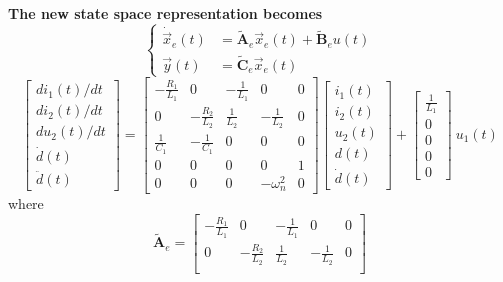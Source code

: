 \documentclass[12pt,a4paper,oneside]{book}
\begin{document}
\begin{onehalfspace}
\begin{mybox}
	\noindent\textbf{The new state space representation becomes}
	\begin{equation}
		\left\lbrace \begin{aligned}
			\dot{\vec{x}}_e(t) &= \tilde{\mathbf{A}}_e \vec{x}_e(t) + 
			\tilde{\mathbf{B}}_e u(t) \\[6pt]
			{\vec{y}}(t) &= \tilde{\mathbf{C}}_e \vec{x}_e(t)
		\end{aligned}\right. 
	\end{equation}
	\begin{equation}
		\begin{bmatrix}
			di_1(t)/dt \\[6pt]
			di_2(t)/dt \\[6pt]
			du_2(t)/dt \\[6pt]
			\dot{d}(t) \\[6pt]
			\ddot{d}(t)
		\end{bmatrix} =
		\begin{bmatrix}
			-\frac{R_1}{L_1} & 0 & -\frac{1}{L_1} & 0 & 0\\[6pt]
			0 & -\frac{R_2}{L_2} & \frac{1}{L_2} & -\frac{1}{L_2} & 0\\[6pt]
			\frac{1}{C_1} & -\frac{1}{C_1} & 0 & 0 & 0 \\[6pt]
			0 & 0 & 0 & 0 & 1 \\[6pt]
			0 & 0 & 0 & -\omega_n^2 & 0
		\end{bmatrix} 
		\begin{bmatrix}
			i_1(t) \\[6pt]
			i_2(t)\\[6pt]
			u_2(t)\\[6pt]
			d(t) \\[6pt]
			\dot{d}(t)
		\end{bmatrix} + 
		\begin{bmatrix}
			\frac{1}{L_1} \\[6pt]
			0 \\[6pt]
			0 \\[6pt]
			0 \\[6pt]
			0
		\end{bmatrix} \ u_1(t)
	\end{equation}
	where
	\begin{equation*}
		\tilde{\mathbf{A}}_e = 
		\begin{bmatrix}
			-\frac{R_1}{L_1} & 0 & -\frac{1}{L_1} & 0 & 0\\[6pt]
			0 & -\frac{R_2}{L_2} & \frac{1}{L_2} & -\frac{1}{L_2} & 0\\[6pt]

\end{bmatrix}
\end{equation*}
\end{mybox}
\end{onehalfspace}
\end{document}
